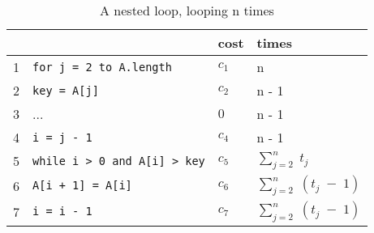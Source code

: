 \begin{center}
	\begin{table}[h]
		\centering
		\begin{tabular}{|l|l|l|l|}
			 \hline
			& & cost & times                      \\ \hline
			1 & \lstinline|for j = 2 to A.length| & $c_1$ & n \\ \hline
			2 & \lstinline|key = A[j]| & $c_2$ & n - 1 \\ \hline
			3 & ... & $0$ & n - 1 \\ \hline
			4 & \lstinline|i = j - 1|                    & $c_4$ & n - 1 \\ \hline
			5 & \lstinline|while i > 0 and A[i] > key| & $c_5$ &  $\sum_{j=2}^{n}\;t_j$ \\ \hline
			6 & \lstinline|A[i + 1] = A[i]| & $c_6$ &  $\sum_{j=2}^{n}\;(t_j\;-\;1)$ \\ \hline
			7 & \lstinline|i = i - 1| & $c_7$ &  $\sum_{j=2}^{n}\;(t_j\;-\;1)$ \\ \hline
		\end{tabular}
		\caption{A nested loop, looping n times}
		\label{tab:insertionCode}
	\end{table}
\end{center}